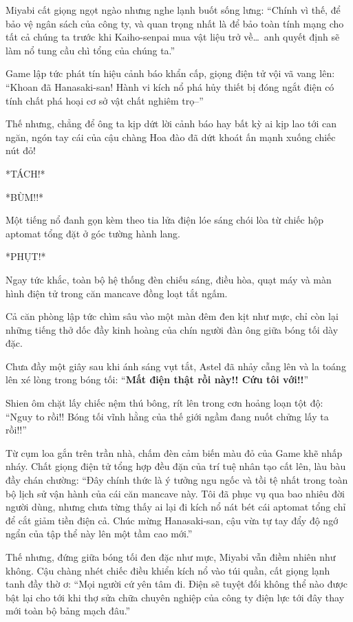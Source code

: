 \documentclass[../main.tex]{subfiles}
\begin{document}
Miyabi cất giọng ngọt ngào nhưng nghe lạnh buốt sống lưng: ``Chính vì thế, để bảo vệ ngân sách của công ty, và quan trọng nhất là để bảo toàn tính mạng cho tất cả chúng ta trước khi Kaiho-senpai mua vật liệu trở về\dots\ anh quyết định sẽ làm nổ tung cầu chì tổng của chúng ta.''

Game lập tức phát tín hiệu cảnh báo khẩn cấp, giọng điện tử vội vã vang lên: ``Khoan đã Hanasaki-san! Hành vi kích nổ phá hủy thiết bị đóng ngắt điện có tính chất phá hoại cơ sở vật chất nghiêm trọ--''

Thế nhưng, chẳng để ông ta kịp dứt lời cảnh báo hay bất kỳ ai kịp lao tới can ngăn, ngón tay cái của cậu chàng Hoa đào đã dứt khoát ấn mạnh xuống chiếc nút đỏ!

*TÁCH!*

*BÙM!!*

Một tiếng nổ đanh gọn kèm theo tia lửa điện lóe sáng chói lòa từ chiếc hộp aptomat tổng đặt ở góc tường hành lang.

*PHỤT!*

Ngay tức khắc, toàn bộ hệ thống đèn chiếu sáng, điều hòa, quạt máy và màn hình điện tử trong căn mancave đồng loạt tắt ngấm.

Cả căn phòng lập tức chìm sâu vào một màn đêm đen kịt như mực, chỉ còn lại những tiếng thở dốc đầy kinh hoàng của chín người đàn ông giữa bóng tối dày đặc.

Chưa đầy một giây sau khi ánh sáng vụt tắt, Astel đã nhảy cẫng lên và la toáng lên xé lòng trong bóng tối: ``\textbf{Mất điện thật rồi này!! Cứu tôi với!!}''

Shien ôm chặt lấy chiếc nệm thú bông, rít lên trong cơn hoảng loạn tột độ: ``Nguy to rồi!! Bóng tối vĩnh hằng của thế giới ngầm đang nuốt chửng lấy ta rồi!!''

Từ cụm loa gắn trên trần nhà, chấm đèn cảm biến màu đỏ của Game khẽ nhấp nháy. Chất giọng điện tử tổng hợp đều đặn của trí tuệ nhân tạo cất lên, làu bàu đầy chán chường: ``Đây chính thức là ý tưởng ngu ngốc và tồi tệ nhất trong toàn bộ lịch sử vận hành của cái căn mancave này. Tôi đã phục vụ qua bao nhiêu đời người dùng, nhưng chưa từng thấy ai lại đi kích nổ nát bét cái aptomat tổng chỉ để cắt giảm tiền điện cả. Chúc mừng Hanasaki-san, cậu vừa tự tay đẩy độ ngớ ngẩn của tập thể này lên một tầm cao mới.''

Thế nhưng, đứng giữa bóng tối đen đặc như mực, Miyabi vẫn điềm nhiên như không. Cậu chàng nhét chiếc điều khiển kích nổ vào túi quần, cất giọng lạnh tanh đầy thờ ơ: ``Mọi người cứ yên tâm đi. Điện sẽ tuyệt đối không thể nào được bật lại cho tới khi thợ sửa chữa chuyên nghiệp của công ty điện lực tới đây thay mới toàn bộ bảng mạch đâu.''
\end{document}
